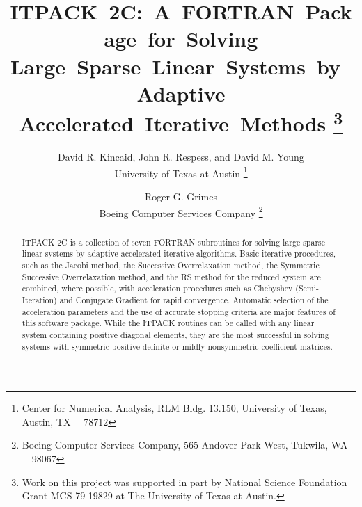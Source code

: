 
\def \la{\langle}
\def \ra{\rangle}
\def \lp{\left(}
\def \rp{\right)}
\def \lb{\left[}
\def \rb{\right]}
\def \lc{\left\{}
\def \rc{\right\}}
\def \om{\omega}
\def \ha{\frac{1}{2}}

\evensidemargin 0.5in
\oddsidemargin 0.5in
\textwidth 5.5in




\title{\mbox{ITPACK 2C: A FORTRAN Package for Solving}
       \mbox{Large Sparse Linear Systems by Adaptive}
       \mbox{Accelerated Iterative Methods} 
 \thanks{Work on this project was supported in part by National
         Science Foundation Grant MCS 79-19829 at The University 
         of Texas at Austin.} }

\author{David R. Kincaid, John R. Respess, and David M. Young \\
        University of Texas at Austin
        \thanks{Center for Numerical Analysis, RLM Bldg. 13.150, 
                University of Texas, Austin, TX \ \ 78712}
        \and
        Roger G. Grimes \\
        Boeing Computer Services Company
        \thanks{Boeing Computer Services Company, 
                565 Andover Park West, Tukwila, WA \ \ 98067}}

\maketitle

\begin{abstract}

ITPACK 2C is a collection of seven FORTRAN subroutines for solving
large sparse linear systems by adaptive accelerated iterative
algorithms.  Basic iterative procedures, such as the Jacobi method, the
Successive Overrelaxation method, the Symmetric Successive
Overrelaxation method, and the RS method for the reduced system are
combined, where possible, with acceleration procedures such as Chebyshev
(Semi-Iteration) and Conjugate Gradient for rapid convergence.
Automatic selection of the acceleration parameters and the use of
accurate stopping criteria are major features of this software package.
While the ITPACK routines can be called with any linear system
containing positive diagonal elements, they are the most successful in
solving systems with symmetric positive definite or mildly nonsymmetric
coefficient matrices.

\end{abstract}

